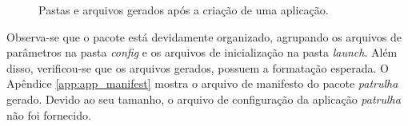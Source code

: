             \begin{figure}[htb]
                \centering
                
                \caption{Pastas e arquivos gerados após a criação de uma aplicação.} \label{fig:patrulha}
            \end{figure}
        
            Observa-se que o pacote está devidamente organizado, agrupando os arquivos de parâmetros na pasta \textit{config} e os arquivos de inicialização na pasta \textit{launch}. Além disso, verificou-se que os arquivos gerados, possuem a formatação esperada. O Apêndice \ref{app:app_manifest} mostra o arquivo de manifesto do pacote \textit{patrulha} gerado. Devido ao seu tamanho, o arquivo de configuração da aplicação \textit{patrulha} não foi fornecido. %
        
